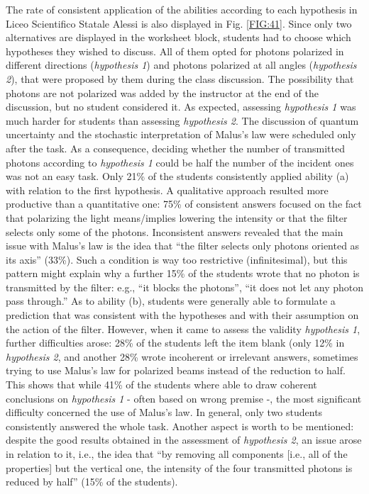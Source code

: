 \documentclass[twocolumn,secnumarabic,amssymb, nobibnotes, aps, prd, nofootinbib]{revtex4-2}
\begin{document}
The rate of consistent application of the abilities according to each hypothesis in Liceo Scientifico Statale Alessi is also displayed in Fig. \ref{FIG:41}. Since only two alternatives are displayed in the worksheet block, students had to choose which hypotheses they wished to discuss. All of them opted for photons polarized in different directions (\textit{hypothesis 1}) and photons polarized at all angles (\textit{hypothesis 2}), that were proposed by them during the class discussion. The possibility that photons are not polarized was added by the instructor at the end of the discussion, but no student considered it. As expected, assessing \textit{hypothesis 1} was much harder for students than assessing \textit{hypothesis 2}. The discussion of quantum uncertainty and the stochastic interpretation of Malus's law were scheduled only after the task. As a consequence, deciding whether the number of transmitted photons according to \textit{hypothesis 1} could be half the number of the incident ones was not an easy task. Only 21\% of the students consistently applied ability (a) with relation to the first hypothesis. A qualitative approach resulted more productive than a quantitative one: 75\% of consistent answers focused on the fact that polarizing the light means/implies lowering the intensity or that the filter selects only some of the photons. Inconsistent answers revealed that the main issue with Malus's law is the idea that ``the filter selects only photons oriented as its axis'' (33\%). Such a condition is way too restrictive (infinitesimal), but this pattern might explain why a further 15\% of the students wrote that no photon is transmitted by the filter: e.g., ``it blocks the photons'', ``it does not let any photon pass through.'' As to ability (b), students were generally able to formulate a prediction that was consistent with the hypotheses and with their assumption on the action of the filter. However, when it came to assess the validity \textit{hypothesis 1}, further difficulties arose: 28\% of the students left the item blank (only 12\% in \textit{hypothesis 2}, and another 28\% wrote incoherent or irrelevant answers, sometimes trying to use Malus's law for polarized beams instead of the reduction to half. This shows that while 41\% of the students where able to draw coherent conclusions on \textit{hypothesis 1} - often based on wrong premise -, the most significant difficulty concerned the use of Malus's law. In general, only two students consistently answered the whole task. Another aspect is worth to be mentioned: despite the good results obtained in the assessment of \textit{hypothesis 2}, an issue arose in relation to it, i.e., the idea that ``by removing all components [i.e., all of the properties] but the vertical one, the intensity of the four transmitted photons is reduced by half'' (15\% of the students).
\end{document}
